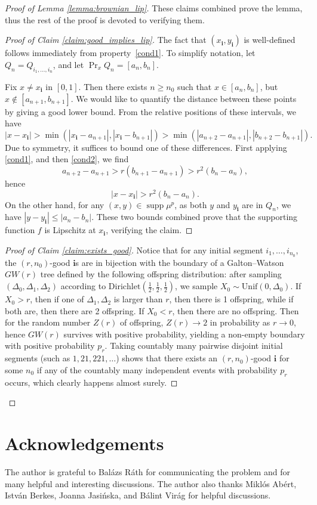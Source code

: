 \documentclass{article}
\newcommand{\supp}{\mathop{\mathrm{supp}}}
\theoremstyle{definition}
\begin{document}
\begin{proof}[Proof of Lemma \ref{lemma:brownian_lip}]
    These claims combined prove the lemma, thus the rest of the proof is devoted to verifying them.

    \begin{proof}[Proof of Claim \ref{claim:good_implies_lip}]
        The fact that \((x_{\mathbf i},y_{\mathbf i})\) is well-defined follows immediately from property~\ref{cond1}. To simplify notation, let $Q_n = Q_{i_1, \dots, i_n}$, and let $\Pr_x Q_n = [a_n, b_n]$.
        
        Fix $x\neq x_{\mathbf{i}}$ in $[0, 1]$. Then there exists $n\geq n_0$ such that $x\in [a_n, b_n]$, but $x \notin [a_{n+1}, b_{n+1}]$. We would like to quantify the distance between these points by giving a good lower bound. From the relative positions of these intervals, we have
        $$|x-x_{\mathbf{i}}|> \min(|x_{\mathbf{i}}-a_{n+1}|, |x_{\mathbf{i}}-b_{n+1}|)>  \min(|a_{n+2}-a_{n+1}|, |b_{n+2}-b_{n+1}|).$$
        Due to symmetry, it suffices to bound one of these differences. First applying \ref{cond1}, and then \ref{cond2}, we find
        $$a_{n+2}-a_{n+1}> r(b_{n+1}-a_{n+1})>r^2(b_n-a_n),$$
        hence 
        $$|x-x_{\mathbf{i}}|> r^2(b_n-a_n).$$
        On the other hand, for any $(x,y)\in \supp \mu^p$, as both $y$ and $y_{\mathbf{i}}$ are in $Q_n$, we have $|y-y_{\mathbf{i}}|\leq |a_n-b_n|$. These two bounds combined prove that the supporting function \(f\) is Lipschitz at \(x_{\mathbf{i}}\), verifying the claim.
    \end{proof}

    \begin{proof}[Proof of Claim \ref{claim:exists_good}]
        Notice that for any initial segment $i_1, \dots, i_{n_0}$, the $(r, n_0)$-good $\mathbf{i}$s are in bijection with the boundary of a Galton--Watson $GW(r)$ tree defined by the following offspring distribution:
        after sampling $(\Delta_0,\Delta_1,\Delta_2)$ according to $ \mathrm{Dirichlet}(\tfrac 1 2,\tfrac 1 2,\tfrac 1 2)$, we sample $X_0\sim \mathrm{Unif}(0, \Delta_0)$. If $X_0>r$, then if one of $\Delta_1, \Delta_2$ is larger than $r$, then there is 1 offspring, while if both are, then there are 2 offspring. If $X_0<r$, then there are no offspring. Then for the random number $Z(r)$ of offspring, $Z(r)\to 2$ in probability as $r\to 0$, hence $GW(r)$ survives with positive probability, yielding a non-empty boundary with positive probability $p_r$. Taking countably many pairwise disjoint initial segments (such as $1, 21, 221, \dots$) shows that there exists an $(r, n_0)$-good $\mathbf{i}$ for some $n_0$ if any of the countably many independent events with probability $p_r$ occurs, which clearly happens almost surely.   
    \end{proof}



\end{proof}

\section*{Acknowledgements}

The author is grateful to Balázs Ráth for communicating the problem and for many helpful and interesting discussions. The author also thanks Miklós Abért, István Berkes, Joanna Jasińska, and Bálint Virág for helpful discussions.

\printbibliography
\end{document}
